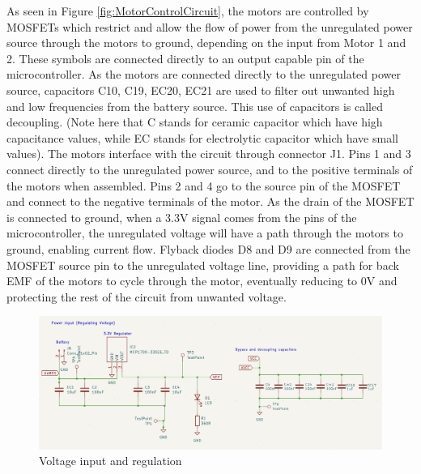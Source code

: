 \documentclass{article}
\begin{document}
As seen in Figure \ref{fig:MotorControlCircuit}, the motors are controlled by MOSFETs which restrict and allow the flow of power from the unregulated power source through the motors to ground, depending on the input from Motor 1 and 2. These symbols are connected directly to an output capable pin of the microcontroller. As the motors are connected directly to the unregulated power source, capacitors C10, C19, EC20, EC21 are used to filter out unwanted high and low frequencies from the battery source. This use of capacitors is called decoupling. (Note here that C stands for ceramic capacitor which have high capacitance values, while EC stands for electrolytic capacitor which have small values). The motors interface with the circuit through connector J1. Pins 1 and 3 connect directly to the unregulated power source, and to the positive terminals of the motors when assembled. Pins 2 and 4 go to the source pin of the MOSFET and connect to the negative terminals of the motor. As the drain of the MOSFET is connected to ground, when a 3.3V signal comes from the pins of the microcontroller, the unregulated voltage will have a path through the motors to ground, enabling current flow. Flyback diodes D8 and D9 are connected from the MOSFET source pin to the unregulated voltage line, providing a path for back EMF of the motors to cycle through the motor, eventually reducing to 0V and protecting the rest of the circuit from unwanted voltage. 
\\

\begin{figure}[H]
    \centering
    \includegraphics[width=0.8\linewidth]{REPORT/VinputandReg.png}
    \caption{Voltage input and regulation}
    \label{fig:VoltageinandReg}
\end{figure}
\end{document}
